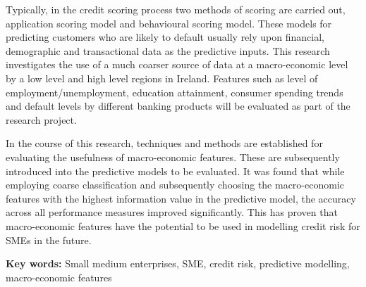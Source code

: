 \documentclass[11pt, oneside]{Thesis} %
\begin{document}
	Typically, in the credit scoring process two methods of scoring are carried out, application scoring model and behavioural scoring model. These models for predicting customers who are likely to default usually rely upon financial, demographic and transactional data as the predictive inputs. This research investigates the use of a much coarser source of data at a macro-economic level by a low level and high level regions in Ireland. Features such as level of employment/unemployment, education attainment, consumer spending trends and default levels by different banking products will be evaluated as part of the research project.
	
	In the course of this research, techniques and methods are established for evaluating the usefulness of macro-economic features. These are subsequently introduced into the predictive models to be evaluated. It was found that while employing coarse classification and subsequently choosing the macro-economic features with the highest information value in the predictive model, the accuracy across all performance measures improved significantly. This has proven that macro-economic features have the potential to be used in modelling credit risk for SMEs in the future.
	
	\textbf{Key words:} Small medium enterprises, SME, credit risk, predictive modelling, macro-economic features
		
		\clearpage
		
		
		\clearpage %
		
		
		\pagestyle{fancy} %
		
\end{document}
